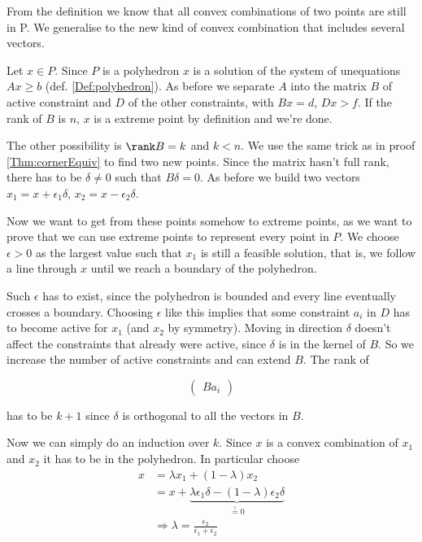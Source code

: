 \begin{pr}
From the definition we know that all convex combinations of two points are still in P. We generalise to the new kind of convex combination that includes several vectors.

Let $x\in P$. Since $P$ is a polyhedron $x$ is a solution of the system of unequations $Ax\geq b$ (def. \ref{Def:polyhedron}). As before we separate $A$ into the matrix $B$ of active constraint and $D$ of the other constraints, with $Bx=d$, $Dx>f$. If the rank of $B$ is $n$, $x$ is a extreme point by definition and we're done. 

The other possibility is $\rank B=k$ and $k<n$. We use the same trick as in proof \ref{Thm:cornerEquiv} to find two new points. Since the matrix hasn't full rank, there has to be $\delta \neq 0$ such that $B\delta = 0$. As before we build two vectors $x_1 = x+ \epsilon_1 \delta$, $x_2=x-\epsilon_2 \delta$. 

Now we want to get from these points somehow to extreme points, as we want to prove that we can use extreme points to represent every point in $P$. We choose $\epsilon>0$ as the largest value such that $x_1$ is still a feasible solution, that is, we follow a line through $x$ until we reach a boundary of the polyhedron. 

Such $\epsilon$ has to exist, since the polyhedron is bounded and every line eventually crosses a boundary. Choosing $\epsilon$ like this implies that some constraint $a_i$ in $D$ has to become active for $x_1$ (and $x_2$ by symmetry). Moving in direction $\delta$ doesn't affect the constraints that already were active, since $\delta$ is in the kernel of $B$. So we increase the number of active constraints and can extend $B$. The rank of

\[\begin{pmatrix}B a_i\end{pmatrix}\]

has to be $k+1$ since $\delta$ is orthogonal to all the vectors in $B$. %

Now we can simply do an induction over $k$. Since $x$ is a convex combination of $x_1$ and $x_2$ it has to be in the polyhedron. In particular choose
\begin{align*}
x&=\lambda x_1+(1-\lambda)x_2\\
&=x+\underbrace{\lambda \epsilon_1\delta -(1-\lambda)\epsilon_2\delta}_{\stackrel{!}{=}0}\\
&\Rightarrow \lambda = \frac{\epsilon_2}{\epsilon_1+\epsilon_2}
\end{align*}

\end{pr}

